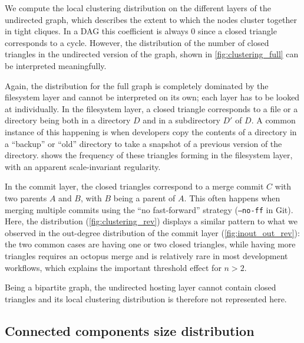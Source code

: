 We compute the local clustering distribution on the different layers of the
undirected graph, which describes the extent to which the nodes cluster
together in tight cliques. In a DAG this coefficient is always 0 since a
closed triangle corresponds to a cycle. However, the distribution of the number
of closed triangles in the undirected version of the graph, shown
in \cref{fig:clustering_full} can be interpreted meaningfully.

Again, the distribution for the full graph is completely dominated by the
filesystem layer and cannot be interpreted on its own; each layer has to be
looked at individually.
In the filesystem layer, a closed triangle corresponds to a file or a directory
being both in a directory $D$ and in a subdirectory $D'$ of $D$. A common
instance of this happening is when developers copy the contents of a directory
in a ``backup'' or ``old'' directory to take a snapshot of a previous version
of the directory.   shows the frequency of these
triangles forming in the filesystem layer, with an apparent scale-invariant
regularity.

In the commit layer, the closed triangles correspond to a merge commit $C$ with
two parents $A$ and $B$, with $B$ being a parent of $A$. This often happens
when merging multiple commits using the ``no fast-forward'' strategy
(\texttt{--no-ff} in Git). Here, the distribution (\cref{fig:clustering_rev})
displays a similar pattern to what we observed in the out-degree distribution
of the commit layer (\cref{fig:inout_out_rev}): the two common cases are
having one or two closed triangles, while having more triangles requires an
octopus merge and is relatively rare in most development workflows, which
explains the important threshold effect for $n > 2$.

Being a bipartite graph, the undirected hosting layer cannot contain closed
triangles and its local clustering distribution is therefore not represented
here.


\subsection{Connected components size distribution}

